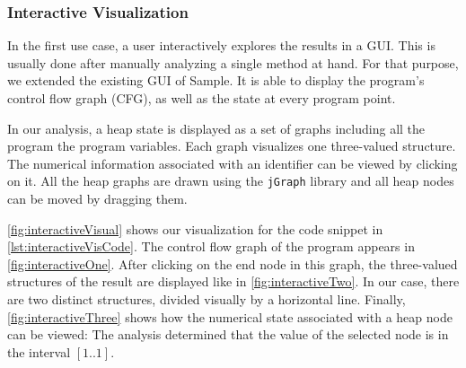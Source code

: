 \documentclass[11pt,a4paper,english]{article}
\begin{document}
\subsubsection*{Interactive Visualization}
In the first use case, a user interactively explores the results in a GUI. This is
usually done after manually analyzing a single method at hand. For that purpose,
we extended the existing GUI of Sample. It is able to display the program's
control flow graph (CFG), as well as the state at every program point. 

In our analysis, a heap state is displayed as a set of graphs including all the
program the program variables. Each graph visualizes one three-valued structure.
The numerical information associated with an identifier can be viewed by
clicking on it. All the heap graphs are drawn using the \texttt{jGraph} library
and all heap nodes can be moved by dragging them.  

\autoref{fig:interactiveVisual} shows our visualization for the code snippet
in \autoref{lst:interactiveVisCode}. The control flow graph of the program
appears in \autoref{fig:interactiveOne}. After clicking on the end node in this
graph, the three-valued structures of the result are displayed like in
\autoref{fig:interactiveTwo}. In our case, there are two distinct structures,
divided visually by a horizontal line. Finally, \autoref{fig:interactiveThree}
shows how the numerical state associated with a heap node can be viewed: The
analysis determined that the value of the selected node is in the interval
$[1..1]$.


\end{document}
